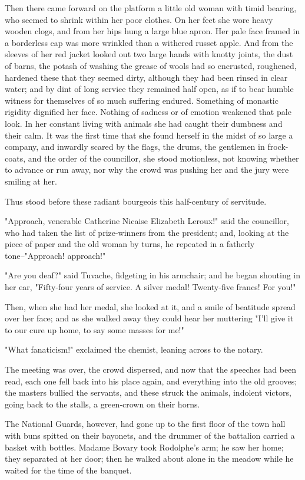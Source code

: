 \documentclass[11pt,twocolumn]{ltugboat}
\begin{document}
Then there came forward on the platform a little old woman with timid
bearing, who seemed to shrink within her poor clothes. On her feet she
wore heavy wooden clogs, and from her hips hung a large blue apron. Her
pale face framed in a borderless cap was more wrinkled than a withered
russet apple. And from the sleeves of her red jacket looked out two
large hands with knotty joints, the dust of barns, the potash of washing
the grease of wools had so encrusted, roughened, hardened these that
they seemed dirty, although they had been rinsed in clear water; and
by dint of long service they remained half open, as if to bear humble
witness for themselves of so much suffering endured. Something of
monastic rigidity dignified her face. Nothing of sadness or of emotion
weakened that pale look. In her constant living with animals she had
caught their dumbness and their calm. It was the first time that she
found herself in the midst of so large a company, and inwardly scared by
the flags, the drums, the gentlemen in frock-coats, and the order of the
councillor, she stood motionless, not knowing whether to advance or run
away, nor why the crowd was pushing her and the jury were smiling at
her.

Thus stood before these radiant bourgeois this half-century of
servitude.

"Approach, venerable Catherine Nicaise Elizabeth Leroux!" said the
councillor, who had taken the list of prize-winners from the president;
and, looking at the piece of paper and the old woman by turns, he
repeated in a fatherly tone--"Approach! approach!"

"Are you deaf?" said Tuvache, fidgeting in his armchair; and he began
shouting in her ear, "Fifty-four years of service. A silver medal!
Twenty-five francs! For you!"

Then, when she had her medal, she looked at it, and a smile of beatitude
spread over her face; and as she walked away they could hear her
muttering "I'll give it to our cure up home, to say some masses for me!"

"What fanaticism!" exclaimed the chemist, leaning across to the notary.

The meeting was over, the crowd dispersed, and now that the speeches had
been read, each one fell back into his place again, and everything into
the old grooves; the masters bullied the servants, and these struck the
animals, indolent victors, going back to the stalls, a green-crown on
their horns.

The National Guards, however, had gone up to the first floor of the
town hall with buns spitted on their bayonets, and the drummer of the
battalion carried a basket with bottles. Madame Bovary took Rodolphe's
arm; he saw her home; they separated at her door; then he walked about
alone in the meadow while he waited for the time of the banquet.
\end{document}
